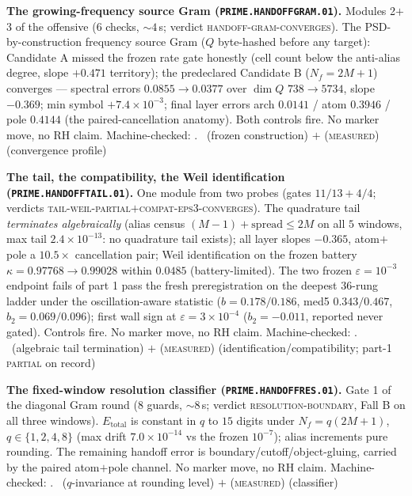 \documentclass[11pt,a4paper]{article}
\theoremstyle{definition}
\begin{document}
\par\smallskip\noindent\textbf{The growing-frequency source Gram
(\texttt{PRIME.HANDOFFGRAM.01}).}
Modules 2$+$3 of the offensive ($6$ checks, ${\sim}4$\,s; verdict
\textsc{handoff-gram-converges}).  The PSD-by-construction
frequency source Gram ($Q$ byte-hashed before any target):
Candidate A missed the frozen rate gate honestly (cell count below
the anti-alias degree, slope $+0.471$ territory); the predeclared
Candidate B ($N_f=2M{+}1$) converges --- spectral errors
$0.0855\to0.0377$ over $\dim Q$ $738\to5734$, slope $-0.369$; min
symbol $+7.4\times10^{-3}$; final layer errors arch $0.0141$ /
atom $0.3946$ / pole $0.4144$ (the paired-cancellation anatomy).
Both controls fire.  No marker move, no RH claim.
Machine-checked: .
\mE\ (frozen construction) $+$ (\textsc{measured}) (convergence
profile)
\par\smallskip

\par\smallskip\noindent\textbf{The tail, the compatibility, the
Weil identification (\texttt{PRIME.HANDOFFTAIL.01}).}
One module from two probes (gates $11/13+4/4$; verdicts
\textsc{tail-weil-partial}$+$\textsc{compat-eps3-converges}).  The
quadrature tail \emph{terminates algebraically} (alias census
$(M{-}1)+\mathrm{spread}\le2M$ on all $5$ windows, max tail
$2.4\times10^{-13}$: no quadrature tail exists); all layer slopes
$-0.365$, atom$+$pole a $10.5\times$ cancellation pair; Weil
identification on the frozen battery
$\kappa=0.97768\to0.99028$ within $0.0485$ (battery-limited).  The
two frozen $\varepsilon=10^{-3}$ endpoint fails of part 1 pass the
fresh preregistration on the deepest $36$-rung ladder under the
oscillation-aware statistic ($b=0.178/0.186$, med5 $0.343/0.467$,
$b_2=0.069/0.096$); first wall sign at $\varepsilon=3\times10^{-4}$
($b_2=-0.011$, reported never gated).  Controls fire.  No marker
move, no RH claim.
Machine-checked: .
\mE\ (algebraic tail termination) $+$ (\textsc{measured})
(identification/compatibility; part-1 \textsc{partial} on record)
\par\smallskip

\par\smallskip\noindent\textbf{The fixed-window resolution
classifier (\texttt{PRIME.HANDOFFRES.01}).}
Gate 1 of the diagonal Gram round ($8$ guards, ${\sim}8$\,s;
verdict \textsc{resolution-boundary}, Fall B on all three windows).
$E_{\mathrm{total}}$ is constant in $q$ to $15$ digits under
$N_f=q(2M{+}1)$, $q\in\{1,2,4,8\}$ (max drift $7.0\times10^{-14}$
vs the frozen $10^{-7}$); alias increments pure rounding.  The
remaining handoff error is boundary/cutoff/object-gluing, carried
by the paired atom$+$pole channel.  No marker move, no RH claim.
Machine-checked: .
\mE\ ($q$-invariance at rounding level) $+$ (\textsc{measured})
(classifier)
\par\smallskip
\end{document}
